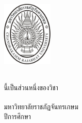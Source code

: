 \makeatletter
\clearpage\pagestyle{empty}
	{\centering
	\fontsize{16}{18.4}\selectfont
		\includegraphics[width=1in]{CRU_LOGO/CRU_Chandra}\\\vspace{\baselineskip}
		\bfseries\@thesistitleThai\\
		\bfseries\@thesistitle
	\vfill
	\fontsize{14}{16.1}\selectfont 
	
	\@authorThai
	\vfill

	\fontsize{13.1}{16.1}\selectfont
	\@typeofwritingThai นี้เป็นส่วนหนึ่งของวิชา\space \@researchsubjectThai\\
	\ifdefined\@degreeThai \@degreeThai\space\fi \ifdefined\@majorThai \@majorThai\space\fi \\
	\ifdefined\@facultyThai \@facultyThai\fi \space มหาวิทยาลัยราชภัฏจันทรเกษม\\
	ปีการศึกษา \the\year
	\par}


\cleardoublepage
\newpage


%
%
%
%

